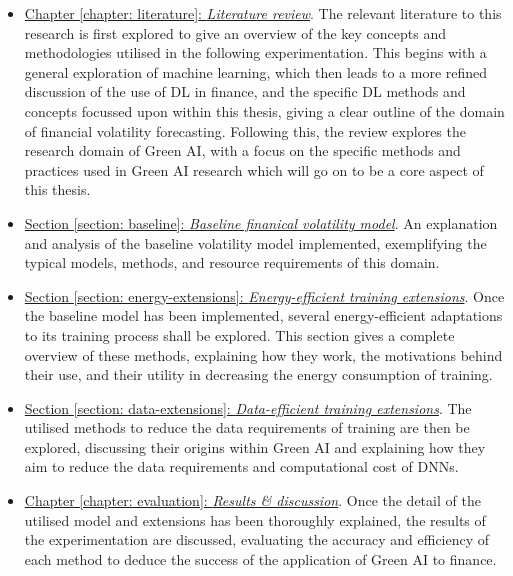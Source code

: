 \documentclass[a4paper, 11pt]{report}
\begin{document}
    \begin{itemize}
        \item \underline{Chapter \ref{chapter: literature}: \emph{Literature review}}. The relevant literature to this research is first explored to give an overview of the key concepts and methodologies utilised in the following experimentation. This begins with a general exploration of machine learning, which then leads to a more refined discussion of the use of DL in finance, and the specific DL methods and concepts focussed upon within this thesis, giving a clear outline of the domain of financial volatility forecasting. Following this, the review explores the research domain of Green AI, with a focus on the specific methods and practices used in Green AI research which will go on to be a core aspect of this thesis.
        
        \item \underline{Section \ref{section: baseline}: \emph{Baseline finanical volatility model}}. An explanation and analysis of the baseline volatility model implemented, exemplifying the typical models, methods, and resource requirements of this domain.

        \item \underline{Section \ref{section: energy-extensions}: \emph{Energy-efficient training extensions}}. Once the baseline model has been implemented, several energy-efficient adaptations to its training process shall be explored. This section gives a complete overview of these methods, explaining how they work, the motivations behind their use, and their utility in decreasing the energy consumption of training.
        
        \item \underline{Section \ref{section: data-extensions}: \emph{Data-efficient training extensions}}. The utilised methods to reduce the data requirements of training are then be explored, discussing their origins within Green AI and explaining how they aim to reduce the data requirements and computational cost of DNNs.
        
        \item \underline{Chapter \ref{chapter: evaluation}: \emph{Results \& discussion}}. Once the detail of the utilised model and extensions has been thoroughly explained, the results of the experimentation are discussed, evaluating the accuracy and efficiency of each method to deduce the success of the application of Green AI to finance.
    \end{itemize}
\end{document}
